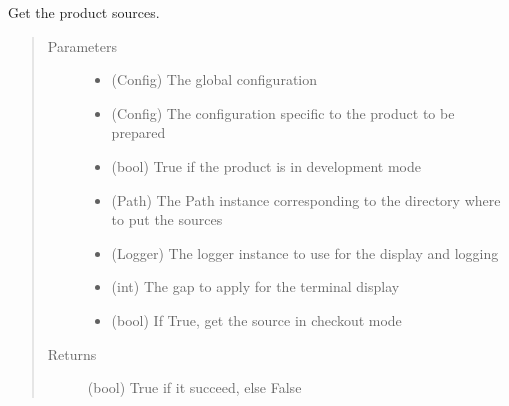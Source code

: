 \documentclass[a4paper,10pt,english]{sphinxmanual}
\begin{document}
\begin{fulllineitems}
\label{\detokenize{apidoc_commands/commands:commands.source.get_product_sources}}
Get the product sources.
\begin{quote}\begin{description}
\item[{Parameters}] \leavevmode\begin{itemize}
\item {} 
 \textendash{} (Config) The global configuration

\item {} 
 \textendash{} (Config) 
The configuration specific to the product to be prepared

\item {} 
 \textendash{} (bool) True if the product is in development mode

\item {} 
 \textendash{} (Path) 
The Path instance corresponding to the directory 
where to put the sources

\item {} 
 \textendash{} (Logger) 
The logger instance to use for the display and logging

\item {} 
 \textendash{} (int) The gap to apply for the terminal display

\item {} 
 \textendash{} (bool) If True, get the source in checkout mode

\end{itemize}

\item[{Returns}] \leavevmode
(bool) True if it succeed, else False

\end{description}\end{quote}

\end{fulllineitems}
\end{document}
